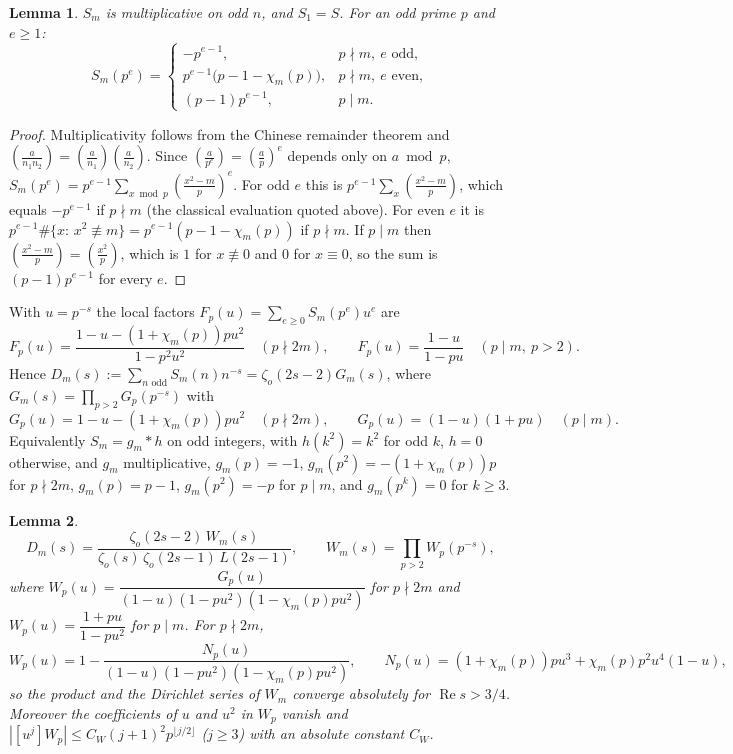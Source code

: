 \documentclass[11pt]{amsart}
\newtheorem{lemma}{Lemma}
\theoremstyle{remark}
\newcommand{\zo}{\zeta_{o}}
\begin{document}
\begin{lemma}\label{lem:local}
$S_m$ is multiplicative on odd $n$, and $S_1=S$. For an odd prime $p$ and $e\ge1$:
\[
S_m(p^e)=\begin{cases}-p^{e-1}, & p\nmid m,\ e\text{ odd},\\ p^{e-1}\big(p-1-\chi_m(p)\big), & p\nmid m,\ e\text{ even},\\ (p-1)p^{e-1}, & p\mid m.\end{cases}
\]
\end{lemma}

\begin{proof}
Multiplicativity follows from the Chinese remainder theorem and $(\frac a{n_1n_2})=(\frac a{n_1})(\frac a{n_2})$. Since $(\frac a{p^e})=(\frac ap)^e$ depends only on $a\bmod p$,
$S_m(p^e)=p^{e-1}\sum_{x\bmod p}(\frac{x^2-m}{p})^e$. For odd $e$ this is $p^{e-1}\sum_x(\frac{x^2-m}p)$, which equals $-p^{e-1}$ if $p\nmid m$ (the classical evaluation quoted above). For even $e$ it is $p^{e-1}\#\{x:\,x^2\not\equiv m\}=p^{e-1}(p-1-\chi_m(p))$ if $p\nmid m$. If $p\mid m$ then $(\frac{x^2-m}p)=(\frac{x^2}p)$, which is $1$ for $x\not\equiv0$ and $0$ for $x\equiv0$, so the sum is $(p-1)p^{e-1}$ for every $e$.
\end{proof}

With $u=p^{-s}$ the local factors $F_p(u)=\sum_{e\ge0}S_m(p^e)u^e$ are
\begin{equation}\label{eq:Fp}
F_p(u)=\frac{1-u-(1+\chi_m(p))pu^2}{1-p^2u^2}\quad(p\nmid 2m),\qquad F_p(u)=\frac{1-u}{1-pu}\quad(p\mid m,\ p>2).
\end{equation}
Hence $D_m(s):=\sum_{n\text{ odd}}S_m(n)n^{-s}=\zo(2s-2)G_m(s)$, where $G_m(s)=\prod_{p>2}G_p(p^{-s})$ with
\[
G_p(u)=1-u-(1+\chi_m(p))pu^2\quad(p\nmid 2m),\qquad G_p(u)=(1-u)(1+pu)\quad(p\mid m).
\]
Equivalently $S_m=g_m*h$ on odd integers, with $h(k^2)=k^2$ for odd $k$, $h=0$ otherwise, and $g_m$ multiplicative, $g_m(p)=-1$, $g_m(p^2)=-(1+\chi_m(p))p$ for $p\nmid 2m$, $g_m(p)=p-1$, $g_m(p^2)=-p$ for $p\mid m$, and $g_m(p^k)=0$ for $k\ge3$.

\begin{lemma}\label{lem:factor}
\[
D_m(s)=\frac{\zo(2s-2)\,W_m(s)}{\zo(s)\,\zo(2s-1)\,L(2s-1)},\qquad W_m(s)=\prod_{p>2}W_p(p^{-s}),
\]
where $W_p(u)=\dfrac{G_p(u)}{(1-u)(1-pu^2)(1-\chi_m(p)pu^2)}$ for $p\nmid 2m$ and $W_p(u)=\dfrac{1+pu}{1-pu^2}$ for $p\mid m$. For $p\nmid 2m$,
\[
W_p(u)=1-\frac{N_p(u)}{(1-u)(1-pu^2)(1-\chi_m(p)pu^2)},\qquad N_p(u)=(1+\chi_m(p))pu^3+\chi_m(p)p^2u^4(1-u),
\]
so the product and the Dirichlet series of $W_m$ converge absolutely for $\operatorname{Re}s>3/4$. Moreover the coefficients of $u$ and $u^2$ in $W_p$ vanish and $|[u^j]W_p|\le C_W(j+1)^2p^{\lfloor j/2\rfloor}$ ($j\ge3$) with an absolute constant $C_W$.
\end{lemma}
\end{document}
